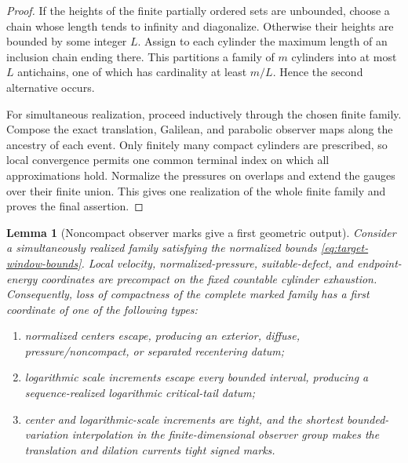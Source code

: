 \documentclass[11pt]{amsart}
\numberwithin{equation}{section}
\theoremstyle{plain}
\newtheorem{lemma}[lemma]{Lemma}
\theoremstyle{definition}
\theoremstyle{remark}
\begin{document}
\begin{proof}
If the heights of the finite partially ordered sets are unbounded, choose a
chain whose length tends to infinity and diagonalize.  Otherwise their heights
are bounded by some integer \(L\).  Assign to each cylinder the maximum length
of an inclusion chain ending there.  This partitions a family of \(m\)
cylinders into at most \(L\) antichains, one of which has cardinality at least
\(m/L\).  Hence the second alternative occurs.

For simultaneous realization, proceed inductively through the chosen finite
family.  Compose the exact translation, Galilean, and parabolic observer maps
along the ancestry of each event.  Only finitely many compact cylinders are
prescribed, so local convergence permits one common terminal index on which
all approximations hold.  Normalize the pressures on overlaps and extend the
gauges over their finite union.  This gives one realization of the whole
finite family and proves the final assertion.
\end{proof}

\begin{lemma}[Noncompact observer marks give a first geometric output]
\label{lem:noncompact-observer-mark-output}
Consider a simultaneously realized family satisfying the normalized bounds
\eqref{eq:target-window-bounds}.  Local velocity, normalized-pressure,
suitable-defect, and endpoint-energy coordinates are precompact on the fixed
countable cylinder exhaustion.  Consequently, loss of compactness of the
complete marked family has a first coordinate of one of the following types:
\begin{enumerate}[label=\textup{(\roman*)},leftmargin=2.2em]
\item normalized centers escape, producing an exterior, diffuse,
pressure/noncompact, or separated recentering datum;
\item logarithmic scale increments escape every bounded interval, producing
a sequence-realized logarithmic critical-tail datum;
\item center and logarithmic-scale increments are tight, and the shortest
bounded-variation interpolation in the finite-dimensional observer group
makes the translation and dilation currents tight signed marks.
\end{enumerate}
\end{lemma}
\end{document}
